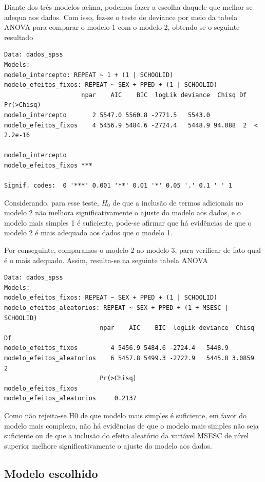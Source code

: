 \documentclass[
  letterpaper,
  DIV=11,
  numbers=noendperiod]{scrartcl}
\begin{document}
Diante dos três modelos acima, podemos fazer a escolha daquele que
melhor se adequa aos dados. Com isso, fez-se o teste de deviance por
meio da tabela ANOVA para comparar o modelo 1 com o modelo 2, obtendo-se
o seguinte resultado

\begin{verbatim}
Data: dados_spss
Models:
modelo_intercepto: REPEAT ~ 1 + (1 | SCHOOLID)
modelo_efeitos_fixos: REPEAT ~ SEX + PPED + (1 | SCHOOLID)
                     npar    AIC    BIC  logLik deviance  Chisq Df Pr(>Chisq)
modelo_intercepto       2 5547.0 5560.8 -2771.5   5543.0                     
modelo_efeitos_fixos    4 5456.9 5484.6 -2724.4   5448.9 94.088  2  < 2.2e-16
                        
modelo_intercepto       
modelo_efeitos_fixos ***
---
Signif. codes:  0 '***' 0.001 '**' 0.01 '*' 0.05 '.' 0.1 ' ' 1
\end{verbatim}

Considerando, para esse teste, \(H_0\) de que a inclusão de termos
adicionais no modelo 2 não melhora significativamente o ajuste do modelo
aos dados, e o modelo mais simples 1 é suficiente, pode-se afirmar que
há evidências de que o modelo 2 é mais adequado aos dados que o modelo
1.

Por conseguinte, comparamos o modelo 2 ao modelo 3, para verificar de
fato qual é o mais adequado. Assim, resulta-se na seguinte tabela ANOVA

\begin{verbatim}
Data: dados_spss
Models:
modelo_efeitos_fixos: REPEAT ~ SEX + PPED + (1 | SCHOOLID)
modelo_efeitos_aleatorios: REPEAT ~ SEX + PPED + (1 + MSESC | SCHOOLID)
                          npar    AIC    BIC  logLik deviance  Chisq Df
modelo_efeitos_fixos         4 5456.9 5484.6 -2724.4   5448.9          
modelo_efeitos_aleatorios    6 5457.8 5499.3 -2722.9   5445.8 3.0859  2
                          Pr(>Chisq)
modelo_efeitos_fixos                
modelo_efeitos_aleatorios     0.2137
\end{verbatim}

Como não rejeita-se H0 de que modelo mais simples é suficiente, em favor
do modelo mais complexo, não há evidências de que o modelo mais simples
não seja suficiente ou de que a inclusão do efeito aleatório da variável
MSESC de nível superior melhore significativamente o ajuste do modelo
aos dados.

\hypertarget{modelo-escolhido}{%
\subsection{Modelo escolhido}\label{modelo-escolhido}}
\end{document}
